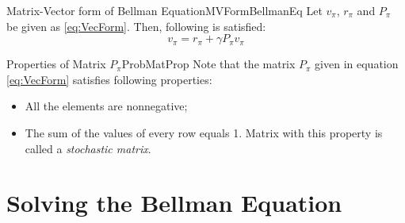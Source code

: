         \begin{thm}{Matrix-Vector form of Bellman Equation}{MVFormBellmanEq}
        Let $v_\pi$, $r_\pi$ and $P_\pi$ be given as \ref{eq:VecForm}. Then, following is satisfied:
            \begin{equation}
                v_\pi = r_\pi + \gamma P_\pi v_\pi
            \end{equation}
        \end{thm}
        \begin{rem}{Properties of Matrix $P_\pi$}{ProbMatProp}
            Note that the matrix $P_\pi$ given in equation \ref{eq:VecForm} satisfies following properties:
            \begin{itemize}
                \item All the elements are nonnegative;
                \item The sum of the values of every row equals 1. Matrix with this property is called a \emph{stochastic matrix}.
            \end{itemize}
        \end{rem}
    \section{Solving the Bellman Equation}
